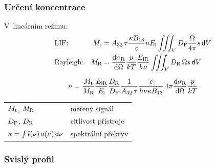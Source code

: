 \documentclass{beamer}
\newcommand\lifetime{\tau}
\newcommand\en{E}
\newcommand\enlaser{\en_\text{l}}
\begin{document}
\begin{frame}
	\frametitle{Určení koncentrace}
	V~lineárním režimu:
	\begin{align*}
		&\text{LIF:} &
		\lifsignal &= A_{32}\,\lifetime \frac{\specoverlap B_{13}}{\lightspeed}
		\dens \enlaser \iiint_\vol \lifsens \frac{\Omega}{4\pi} s \dd{\vol} \\
		&\text{Rayleigh:} & \rayleighsignal &= \rayleighxsec \frac{p}{kT}
		\frac{\enrayleigh}{\planck\freq}
		\iiint_\vol \rayleighsens\,\Omega s \dd{\vol}
	\end{align*}
	\begin{block}{}
		\begin{equation*}
			\label{eq:label}
			\dens = \frac{\lifsignal}{\rayleighsignal}
			\frac{\enrayleigh}{\enlaser}\frac{\rayleighsens}{\lifsens}
			\frac{1}{A_{32}\,\tau}
			\frac{\lightspeed}{\planck\freq\specoverlap B_{13}}
			\, 4\pi \rayleighxsec \frac{p}{kT}
		\end{equation*}
	\end{block}
	\medskip
	\begin{tabular}{l l}
		$M_\text{t}$, $M_\text{R}$ & měřený signál \\
		$D_\text{F}$, $D_\text{R}$ & citlivost přístroje \\
		$\kappa = \int l(\nu)\,a(\nu) \,\mathsf{d}\nu$
		& spektrální překryv
	\end{tabular}
\end{frame}

\newcommand\flamey{h}

\begin{frame}
	\frametitle{Svislý profil}
	\begin{columns}[c]
		\begin{column}{0.48\textwidth}
		\end{column}
		\begin{column}{0.48\textwidth}
		\end{column}
	\end{columns}
\end{frame}
\end{document}
